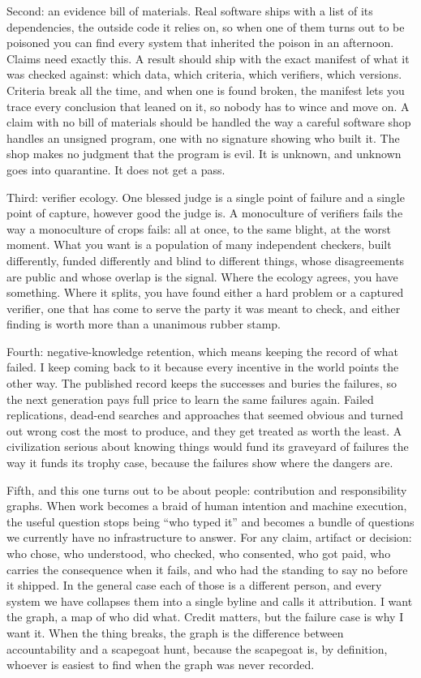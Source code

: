 \documentclass[11pt]{article}
\begin{document}
Second: an evidence bill of materials. Real software ships with a list of its dependencies, the outside code it relies on, so when one of them turns out to be poisoned you can find every system that inherited the poison in an afternoon. Claims need exactly this. A result should ship with the exact manifest of what it was checked against: which data, which criteria, which verifiers, which versions. Criteria break all the time, and when one is found broken, the manifest lets you trace every conclusion that leaned on it, so nobody has to wince and move on. A claim with no bill of materials should be handled the way a careful software shop handles an unsigned program, one with no signature showing who built it. The shop makes no judgment that the program is evil. It is unknown, and unknown goes into quarantine. It does not get a pass.

Third: verifier ecology. One blessed judge is a single point of failure and a single point of capture, however good the judge is. A monoculture of verifiers fails the way a monoculture of crops fails: all at once, to the same blight, at the worst moment. What you want is a population of many independent checkers, built differently, funded differently and blind to different things, whose disagreements are public and whose overlap is the signal. Where the ecology agrees, you have something. Where it splits, you have found either a hard problem or a captured verifier, one that has come to serve the party it was meant to check, and either finding is worth more than a unanimous rubber stamp.

Fourth: negative-knowledge retention, which means keeping the record of what failed. I keep coming back to it because every incentive in the world points the other way. The published record keeps the successes and buries the failures, so the next generation pays full price to learn the same failures again. Failed replications, dead-end searches and approaches that seemed obvious and turned out wrong cost the most to produce, and they get treated as worth the least. A civilization serious about knowing things would fund its graveyard of failures the way it funds its trophy case, because the failures show where the dangers are.

Fifth, and this one turns out to be about people: contribution and responsibility graphs. When work becomes a braid of human intention and machine execution, the useful question stops being ``who typed it'' and becomes a bundle of questions we currently have no infrastructure to answer. For any claim, artifact or decision: who chose, who understood, who checked, who consented, who got paid, who carries the consequence when it fails, and who had the standing to say no before it shipped. In the general case each of those is a different person, and every system we have collapses them into a single byline and calls it attribution. I want the graph, a map of who did what. Credit matters, but the failure case is why I want it. When the thing breaks, the graph is the difference between accountability and a scapegoat hunt, because the scapegoat is, by definition, whoever is easiest to find when the graph was never recorded.
\end{document}
